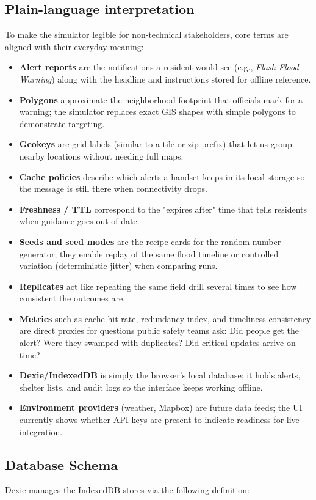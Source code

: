 \subsection{Plain-language interpretation}
To make the simulator legible for non-technical stakeholders, core terms are aligned with their everyday meaning:
\begin{itemize}
    \item \textbf{Alert reports} are the notifications a resident would see (e.g., \emph{Flash Flood Warning}) along with the headline and instructions stored for offline reference.
    \item \textbf{Polygons} approximate the neighborhood footprint that officials mark for a warning; the simulator replaces exact GIS shapes with simple polygons to demonstrate targeting.
    \item \textbf{Geokeys} are grid labels (similar to a tile or zip-prefix) that let us group nearby locations without needing full maps.
    \item \textbf{Cache policies} describe which alerts a handset keeps in its local storage so the message is still there when connectivity drops.
    \item \textbf{Freshness / TTL} correspond to the "expires after" time that tells residents when guidance goes out of date.
    \item \textbf{Seeds and seed modes} are the recipe cards for the random number generator; they enable replay of the same flood timeline or controlled variation (deterministic jitter) when comparing runs.
    \item \textbf{Replicates} act like repeating the same field drill several times to see how consistent the outcomes are.
    \item \textbf{Metrics} such as cache-hit rate, redundancy index, and timeliness consistency are direct proxies for questions public safety teams ask: Did people get the alert? Were they swamped with duplicates? Did critical updates arrive on time?
    \item \textbf{Dexie/IndexedDB} is simply the browser's local database; it holds alerts, shelter lists, and audit logs so the interface keeps working offline.
    \item \textbf{Environment providers} (weather, Mapbox) are future data feeds; the UI currently shows whether API keys are present to indicate readiness for live integration.
\end{itemize}

\subsection{Database Schema}
Dexie manages the IndexedDB stores via the following definition:

